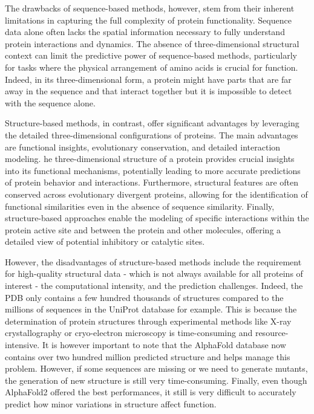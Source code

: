 The drawbacks of sequence-based methods, however, stem from their inherent limitations in capturing the full complexity of protein functionality. Sequence data alone often lacks the spatial information necessary to fully understand protein interactions and dynamics. The absence of three-dimensional structural context can limit the predictive power of sequence-based methods, particularly for tasks where the physical arrangement of amino acids is crucial for function. Indeed, in its three-dimensional form, a protein might have parts that are far away in the sequence and that interact together but it is impossible to detect with the sequence alone. 

Structure-based methods, in contrast, offer significant advantages by leveraging the detailed three-dimensional configurations of proteins. The main advantages are functional insights, evolutionary conservation, and detailed interaction modeling. he three-dimensional structure of a protein provides crucial insights into its functional mechanisms, potentially leading to more accurate predictions of protein behavior and interactions. Furthermore, structural features are often conserved across evolutionary divergent proteins, allowing for the identification of functional similarities even in the absence of sequence similarity. Finally, structure-based approaches enable the modeling of specific interactions within the protein active site and between the protein and other molecules, offering a detailed view of potential inhibitory or catalytic sites.

However, the disadvantages of structure-based methods include the requirement for high-quality structural data - which is not always available for all proteins of interest - the computational intensity, and the prediction challenges. Indeed, the PDB only contains a few hundred thousands of structures compared to the millions of sequences in the UniProt database for example. This is because the determination of protein structures through experimental methods like X-ray crystallography or cryo-electron microscopy is time-consuming and resource-intensive. It is however important to note that the AlphaFold database now contains over two hundred million predicted structure and helps manage this problem. However, if some sequences are missing or we need to generate mutants, the generation of new structure is still very time-consuming. Finally, even though AlphaFold2 offered the best performances, it still is very difficult to accurately predict how minor variations in structure affect function. \cite{Buel2022AlphaFold}

